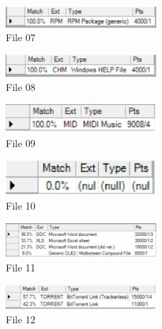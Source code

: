 \documentclass[a4paper,10pt,oneside]{article}
\begin{document}
\begin{figure}[!ht]
        \centering
        \includegraphics[width=0.5\textwidth]{07}
        \caption{File 07}
\end{figure}
\begin{figure}[!ht]
        \centering
        \includegraphics[width=0.5\textwidth]{08}
        \caption{File 08}
\end{figure}
\begin{figure}[!ht]
        \centering
        \includegraphics[width=0.5\textwidth]{09}
        \caption{File 09}
\end{figure}
\begin{figure}[!ht]
        \centering
        \includegraphics[width=0.5\textwidth]{10}
        \caption{File 10}
\end{figure}
\begin{figure}[!ht]
        \centering
        \includegraphics[width=0.5\textwidth]{11}
        \caption{File 11}
\end{figure}
\begin{figure}[!ht]
        \centering
        \includegraphics[width=0.5\textwidth]{12}
        \caption{File 12}
\end{figure}
\end{document}
